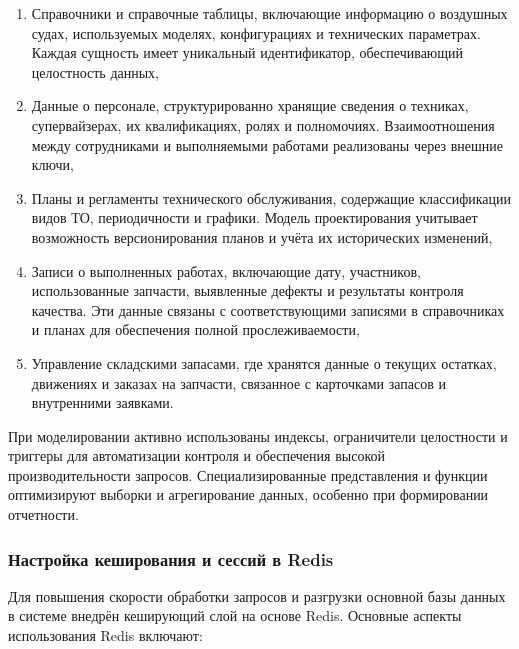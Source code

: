 \documentclass[14pt,a4paper]{extarticle}
\begin{document}
\begin{enumerate}
\item Справочники и справочные таблицы, включающие информацию о воздушных судах, используемых моделях, конфигурациях и технических параметрах. Каждая сущность имеет уникальный идентификатор, обеспечивающий целостность данных,

\item Данные о персонале, структурированно хранящие сведения о техниках, супервайзерах, их квалификациях, ролях и полномочиях. Взаимоотношения между сотрудниками и выполняемыми работами реализованы через внешние ключи,

\item Планы и регламенты технического обслуживания, содержащие классификации видов ТО, периодичности и графики. Модель проектирования учитывает возможность версионирования планов и учёта их исторических изменений,

\item Записи о выполненных работах, включающие дату, участников, использованные запчасти, выявленные дефекты и результаты контроля качества. Эти данные связаны с соответствующими записями в справочниках и планах для обеспечения полной прослеживаемости,

\item Управление складскими запасами, где хранятся данные о текущих остатках, движениях и заказах на запчасти, связанное с карточками запасов и внутренними заявками.
\end{enumerate}

При моделировании активно использованы индексы, ограничители целостности и триггеры для автоматизации контроля и обеспечения высокой производительности запросов. Специализированные представления и функции оптимизируют выборки и агрегирование данных, особенно при формировании отчетности.

\subsubsection{Настройка кеширования и сессий в Redis}

Для повышения скорости обработки запросов и разгрузки основной базы данных в системе внедрён кеширующий слой на основе Redis. Основные аспекты использования Redis включают:
\end{document}
